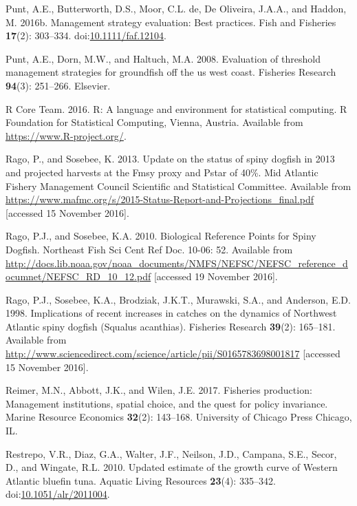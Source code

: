 \documentclass[]{article}
\begin{document}
\hypertarget{ref-punt_management_2016}{}
Punt, A.E., Butterworth, D.S., Moor, C.L. de, De Oliveira, J.A.A., and
Haddon, M. 2016b. Management strategy evaluation: Best practices. Fish
and Fisheries \textbf{17}(2): 303--334.
doi:\href{https://doi.org/10.1111/faf.12104}{10.1111/faf.12104}.

\hypertarget{ref-punt2008evaluation}{}
Punt, A.E., Dorn, M.W., and Haltuch, M.A. 2008. Evaluation of threshold
management strategies for groundfish off the us west coast. Fisheries
Research \textbf{94}(3): 251--266. Elsevier.

\hypertarget{ref-Rcite}{}
R Core Team. 2016. R: A language and environment for statistical
computing. R Foundation for Statistical Computing, Vienna, Austria.
Available from \url{https://www.R-project.org/}.

\hypertarget{ref-rago_update_2013}{}
Rago, P., and Sosebee, K. 2013. Update on the status of spiny dogfish in
2013 and projected harvests at the Fmsy proxy and Pstar of 40\%. Mid
Atlantic Fishery Management Council Scientific and Statistical
Committee. Available from
\url{https://www.mafmc.org/s/2015-Status-Report-and-Projections_final.pdf}
{[}accessed 15 November 2016{]}.

\hypertarget{ref-rago_biological_2010}{}
Rago, P.J., and Sosebee, K.A. 2010. Biological Reference Points for
Spiny Dogfish. Northeast Fish Sci Cent Ref Doc. 10-06: 52. Available
from
\url{http://docs.lib.noaa.gov/noaa_documents/NMFS/NEFSC/NEFSC_reference_documnet/NEFSC_RD_10_12.pdf}
{[}accessed 19 November 2016{]}.

\hypertarget{ref-rago_implications_1998}{}
Rago, P.J., Sosebee, K.A., Brodziak, J.K.T., Murawski, S.A., and
Anderson, E.D. 1998. Implications of recent increases in catches on the
dynamics of Northwest Atlantic spiny dogfish (Squalus acanthias).
Fisheries Research \textbf{39}(2): 165--181. Available from
\url{http://www.sciencedirect.com/science/article/pii/S0165783698001817}
{[}accessed 15 November 2016{]}.

\hypertarget{ref-reimer2017fisheries}{}
Reimer, M.N., Abbott, J.K., and Wilen, J.E. 2017. Fisheries production:
Management institutions, spatial choice, and the quest for policy
invariance. Marine Resource Economics \textbf{32}(2): 143--168.
University of Chicago Press Chicago, IL.

\hypertarget{ref-restrepo_updated_2010}{}
Restrepo, V.R., Diaz, G.A., Walter, J.F., Neilson, J.D., Campana, S.E.,
Secor, D., and Wingate, R.L. 2010. Updated estimate of the growth curve
of Western Atlantic bluefin tuna. Aquatic Living Resources
\textbf{23}(4): 335--342.
doi:\href{https://doi.org/10.1051/alr/2011004}{10.1051/alr/2011004}.
\end{document}
